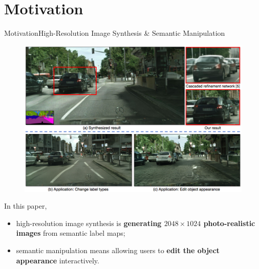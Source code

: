 \documentclass{beamer}
\begin{document}
\section{Motivation}
\begin{frame}{Motivation}{High-Resolution Image Synthesis \& Semantic Manipulation }
\begin{figure}
	\centering
	\includegraphics[height=0.5\textheight]{images/conclusion}
\end{figure}
%
%
\begin{beamerboxesrounded}[upper=uppercol,lower=lowercol,shadow=false]{In this paper,}
	\begin{itemize}
	\item
	high-resolution image synthesis is \textbf{generating $2048\times1024$ photo-realistic images} from semantic label maps;
	\item
	semantic manipulation means allowing users to \textbf{edit the object appearance} interactively.
	\end{itemize}
\end{beamerboxesrounded}
\end{frame}
\end{document}
